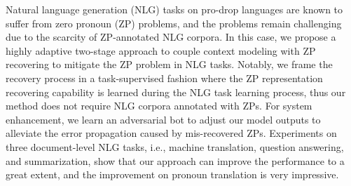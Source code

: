Natural language generation (NLG) tasks on pro-drop languages are known to suffer from zero pronoun (ZP) problems, and the problems remain challenging due to the scarcity of ZP-annotated NLG corpora. In this case, we propose a highly adaptive two-stage approach to couple context modeling with ZP recovering to mitigate the ZP problem in NLG tasks. Notably, we frame the recovery process in a task-supervised fashion where the ZP representation recovering capability is learned during the NLG task learning process, thus our method does not require NLG corpora annotated with ZPs. For system enhancement, we learn an adversarial bot to adjust our model outputs to alleviate the error propagation caused by mis-recovered ZPs. Experiments on three document-level NLG tasks, i.e., machine translation, question answering, and summarization, show that our approach can improve the performance to a great extent, and the improvement on pronoun translation is very impressive.
